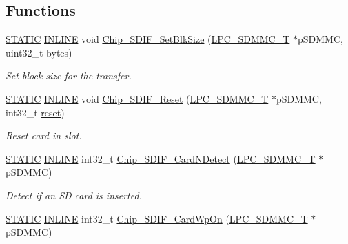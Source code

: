 \subsection*{Functions}
\begin{DoxyCompactItemize}
\item 
\hyperlink{group___l_p_c___types___public___macros_ga10b2d890d871e1489bb02b7e70d9bdfb}{S\+T\+A\+T\+IC} \hyperlink{spifi__18xx__43xx_8h_a2eb6f9e0395b47b8d5e3eeae4fe0c116}{I\+N\+L\+I\+NE} void \hyperlink{group___s_d_i_f__18_x_x__43_x_x_ga7d88c1bd3f846dfe6375c7797a295795}{Chip\+\_\+\+S\+D\+I\+F\+\_\+\+Set\+Blk\+Size} (\hyperlink{struct_l_p_c___s_d_m_m_c___t}{L\+P\+C\+\_\+\+S\+D\+M\+M\+C\+\_\+T} $\ast$p\+S\+D\+M\+MC, uint32\+\_\+t bytes)
\begin{DoxyCompactList}\small\item\em Set block size for the transfer. \end{DoxyCompactList}\item 
\hyperlink{group___l_p_c___types___public___macros_ga10b2d890d871e1489bb02b7e70d9bdfb}{S\+T\+A\+T\+IC} \hyperlink{spifi__18xx__43xx_8h_a2eb6f9e0395b47b8d5e3eeae4fe0c116}{I\+N\+L\+I\+NE} void \hyperlink{group___s_d_i_f__18_x_x__43_x_x_ga40411a54dae88b2b176c68c44846d709}{Chip\+\_\+\+S\+D\+I\+F\+\_\+\+Reset} (\hyperlink{struct_l_p_c___s_d_m_m_c___t}{L\+P\+C\+\_\+\+S\+D\+M\+M\+C\+\_\+T} $\ast$p\+S\+D\+M\+MC, int32\+\_\+t \hyperlink{enet__18xx__43xx_8c_aeb253604a11400185c3a9933e18c68c3}{reset})
\begin{DoxyCompactList}\small\item\em Reset card in slot. \end{DoxyCompactList}\item 
\hyperlink{group___l_p_c___types___public___macros_ga10b2d890d871e1489bb02b7e70d9bdfb}{S\+T\+A\+T\+IC} \hyperlink{spifi__18xx__43xx_8h_a2eb6f9e0395b47b8d5e3eeae4fe0c116}{I\+N\+L\+I\+NE} int32\+\_\+t \hyperlink{group___s_d_i_f__18_x_x__43_x_x_gaeed25ed66fbdf6d35d351acca47176ba}{Chip\+\_\+\+S\+D\+I\+F\+\_\+\+Card\+N\+Detect} (\hyperlink{struct_l_p_c___s_d_m_m_c___t}{L\+P\+C\+\_\+\+S\+D\+M\+M\+C\+\_\+T} $\ast$p\+S\+D\+M\+MC)
\begin{DoxyCompactList}\small\item\em Detect if an SD card is inserted. \end{DoxyCompactList}\item 
\hyperlink{group___l_p_c___types___public___macros_ga10b2d890d871e1489bb02b7e70d9bdfb}{S\+T\+A\+T\+IC} \hyperlink{spifi__18xx__43xx_8h_a2eb6f9e0395b47b8d5e3eeae4fe0c116}{I\+N\+L\+I\+NE} int32\+\_\+t \hyperlink{group___s_d_i_f__18_x_x__43_x_x_gabe0627da22e658357f0709ec5a354b74}{Chip\+\_\+\+S\+D\+I\+F\+\_\+\+Card\+Wp\+On} (\hyperlink{struct_l_p_c___s_d_m_m_c___t}{L\+P\+C\+\_\+\+S\+D\+M\+M\+C\+\_\+T} $\ast$p\+S\+D\+M\+MC)

\end{DoxyCompactItemize}

